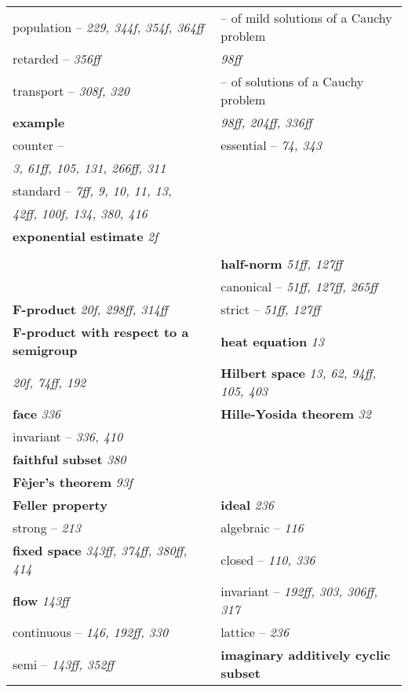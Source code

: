 \begin{longtable}{p{}p{}}
\quad population -- \textit{229, 344f, 354f, 364ff} & \quad -- of mild solutions of a Cauchy problem \\
\quad retarded -- \textit{356ff} & \quad\quad \textit{98ff} \\
\quad transport -- \textit{308f, 320} & \quad -- of solutions of a Cauchy problem \\
\textbf{example} & \quad\quad \textit{98ff, 204ff, 336ff} \\
\quad counter -- & \quad essential -- \textit{74, 343} \\
\quad\quad \textit{3, 61ff, 105, 131, 266ff, 311} & \\
\quad standard -- \textit{7ff, 9, 10, 11, 13,} & \\
\quad\quad \textit{42ff, 100f, 134, 380, 416} & \\
\textbf{exponential estimate} \textit{2f} & \\
& \\
& \textbf{half-norm} \textit{51ff, 127ff} \\
& \quad canonical -- \textit{51ff, 127ff, 265ff} \\
\textbf{F-product} \textit{20f, 298ff, 314ff} & \quad strict -- \textit{51ff, 127ff} \\
\textbf{F-product with respect to a semigroup} & \textbf{heat equation} \textit{13} \\
\quad \textit{20f, 74ff, 192} & \textbf{Hilbert space} \textit{13, 62, 94ff, 105, 403} \\
\textbf{face} \textit{336} & \textbf{Hille-Yosida theorem} \textit{32} \\
\quad invariant -- \textit{336, 410} & \\
\textbf{faithful subset} \textit{380} & \\
\textbf{Fèjer's theorem} \textit{93f} & \\
\textbf{Feller property} & \textbf{ideal} \textit{236} \\
\quad strong -- \textit{213} & \quad algebraic -- \textit{116} \\
\textbf{fixed space} \textit{343ff, 374ff, 380ff, 414} & \quad closed -- \textit{110, 336} \\
\textbf{flow} \textit{143ff} & \quad invariant -- \textit{192ff, 303, 306ff, 317} \\
\quad continuous -- \textit{146, 192ff, 330} & \quad lattice -- \textit{236} \\
\quad semi -- \textit{143ff, 352ff} & \textbf{imaginary additively cyclic subset} \\

\end{longtable}
